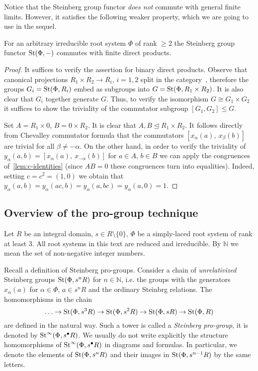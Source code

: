 \documentclass[oneside, 11pt]{amsart} \pdfoutput=1
\begin{document}
Notice that the Steinberg group functor {\it does not} commute with general finite limits. However, it satisfies the following weaker property, which we are going to use in the sequel.
\begin{lemma} \label{lem:fprod} For an arbitrary irreducible root system $\Phi$ of rank $\geq 2$ the Steinberg group functor $\mathop{\mathrm{St}}\nolimits(\Phi, -)$ commutes with finite direct products. \end{lemma}
\begin{proof} 
It suffices to verify the assertion for binary direct products.
Observe that canonical projections $R_1 \times R_2 \to R_i$, $i=1,2$ split in the category~, therefore the groups $G_i = \mathop{\mathrm{St}}\nolimits(\Phi, R_i)$ embed as subgroups into $G = \mathop{\mathrm{St}}\nolimits(\Phi, R_1 \times R_2)$. It is also clear that $G_i$ together generate $G$. Thus, to verify the isomorphism $G \cong G_1 \times G_2$ it suffices to show the triviality of the commutator subgroup $[G_1, G_2] \leq G$.

Set $A = R_1\times 0$, $B = 0 \times R_2$. It is clear that $A, B \trianglelefteq R_1 \times R_2$. 
It follows directly from Chevalley commutator formula that the commutators $[x_{\alpha}(a),\ x_\beta(b)]$ are trivial for all $\beta \neq -\alpha$. On the other hand, in order to verify the triviality of $y_\alpha(a, b) = [x_{\alpha}(a),\ x_{-\alpha}(b)]$ for $a\in A$, $b\in B$ we can apply the congruences of~\cref{lem:c-identities} (since $AB=0$ these congruences turn into equalities).
Indeed, setting $c = c^2 = (1, 0)$ we obtain that $y_\alpha(a, b) = y_\alpha(ac, b) = y_\alpha(a, bc) = y_\alpha(a, 0) = 1$. \end{proof}

\subsection{Overview of the pro-group technique}
Let $R$ be an integral domain, $s \in R \setminus \{0\}$, $\Phi$ be a simply-laced root system of rank at least $3$. All root systems in this text are reduced and irreducible. By \(\mathbb N\) we mean the set of non-negative integer numbers.

Recall a definition of Steinberg pro-groups. Consider a chain of {\it unrelativized} Steinberg groups $\mathop{\mathrm{St}}\nolimits(\Phi, s^n R)$ for $n \in \mathbb N$, i.e. the groups with the generators $x_{\alpha}(a)$ for $\alpha \in \Phi$, $a \in s^n R$ and the ordinary Steinbrg relations. The homomorphisms in the chain
$$
\ldots \to \mathop{\mathrm{St}}\nolimits(\Phi, s^3 R) \to \mathop{\mathrm{St}}\nolimits(\Phi, s^2 R) \to \mathop{\mathrm{St}}\nolimits(\Phi, s R) \to \mathop{\mathrm{St}}\nolimits(\Phi, R)
$$
are defined in the natural way. Such a tower is called a {\it Steinberg pro-group}, it is denoted by $\mathop{\mathrm{St}}\nolimits^\infty(\Phi, s^\bullet R)$. We usually do not write explicitly the structure homomorphisms of $\mathop{\mathrm{St}}\nolimits^\infty(\Phi, s^\bullet R)$ in diagrams and formulas. In particular, we denote the elements of $\mathop{\mathrm{St}}\nolimits(\Phi, s^n R)$ and their images in $\mathop{\mathrm{St}}\nolimits(\Phi, s^{n - 1} R)$ by the same letters.
\end{document}

